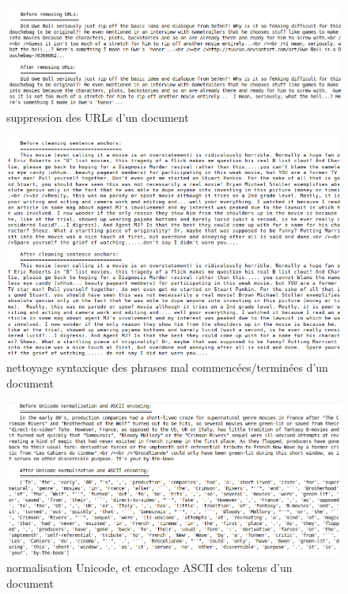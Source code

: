 \documentclass[12pt,a4paper]{report}
\theoremstyle{definition}
\begin{document}
\begin{appendices}
\begin{figure}[!ht]
  \centering
  \includegraphics[scale=0.45]{images/snapshots/remove_urls.png}
  \caption{suppression des URLs d'un document}
  \label{fig:remove_urls}
\end{figure}

\begin{figure}[!ht]
  \centering
  \includegraphics[scale=0.6]{images/snapshots/clean_sentence_anchors.png}
  \caption{nettoyage syntaxique des phrases mal commencées/terminées d'un document}
  \label{fig:clean_sentence_anchors}
\end{figure}

\begin{figure}[!ht]
  \centering
  \includegraphics[scale=0.45]{images/snapshots/remove_non_ascii.png}
  \caption{normalisation Unicode, et encodage ASCII des tokens d'un document}
  \label{fig:remove_non_ascii}
\end{figure}


\end{appendices}
\end{document}
